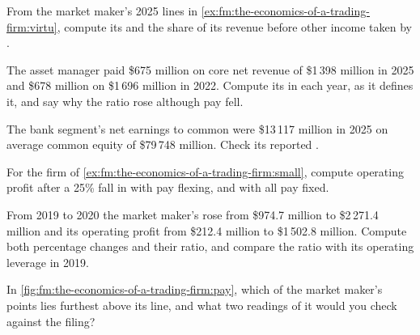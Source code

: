 \begin{exercise}[$\star$]\label{exo:fm:the-economics-of-a-trading-firm:1}
From the market maker's 2025 lines in \cref{ex:fm:the-economics-of-a-trading-firm:virtu}, compute its  and the share of its
revenue before other income taken by .
\end{exercise}

\begin{exercise}[$\star$]\label{exo:fm:the-economics-of-a-trading-firm:2}
The asset manager paid \$675 million on core net revenue of \$1\,398 million in 2025 and \$678 million on \$1\,696 million in 2022. Compute its
 in each year, as it defines it, and say why the ratio rose although pay fell.
\end{exercise}

\begin{exercise}[$\star$]\label{exo:fm:the-economics-of-a-trading-firm:3}
The bank segment's net earnings to common were \$13\,117 million in 2025 on average common equity of \$79\,748 million. Check its reported .
\end{exercise}

\begin{exercise}[$\star\star$]\label{exo:fm:the-economics-of-a-trading-firm:4}
For the firm of \cref{ex:fm:the-economics-of-a-trading-firm:small}, compute operating profit after a 25\% fall in  with pay
flexing, and with all pay fixed.
\end{exercise}

\begin{exercise}[$\star\star$]\label{exo:fm:the-economics-of-a-trading-firm:5}
From 2019 to 2020 the market maker's  rose from \$974.7 million to \$2\,271.4 million and its operating profit from \$212.4
million to \$1\,502.8 million. Compute both percentage changes and their ratio, and compare the ratio with its operating leverage in 2019.
\end{exercise}

\begin{exercise}[$\star\star$]\label{exo:fm:the-economics-of-a-trading-firm:6}
In \cref{fig:fm:the-economics-of-a-trading-firm:pay}, which of the market maker's points lies furthest above its line, and what two readings of it
would you check against the filing?
\end{exercise}

